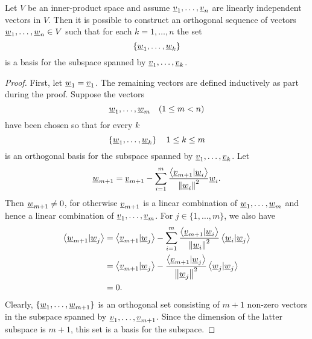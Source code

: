 \begin{theorem}
Let $V$ be an inner-product space and assume $\underline{v}_1, \ldots, \underline{v}_n$ are linearly independent vectors in $V$.
Then it is possible to construct an orthogonal sequence of vectors $\underline{w}_1, \ldots, \underline{w}_n \in V$ such that for each $k = 1, \ldots, n$ the set
\begin{equation*}
\left\{ \underline{w}_1, \ldots, \underline{w}_k \right\}
\end{equation*}
is a basis for the subspace spanned by $\underline{v}_1, \ldots, \underline{v}_k$.
\end{theorem}
\begin{proof}
First, let $\underline{w}_1 = \underline{v}_1$.
The remaining vectors are defined inductively as part during the proof.
Suppose the vectors
\begin{equation*}
\underline{w}_1, \ldots, \underline{w}_m \quad (1 \leq m < n)
\end{equation*}
have been chosen so that for every $k$
\begin{equation*}
\left\{ \underline{w}_1, \ldots, \underline{w}_k \right\} \quad 1 \leq k \leq m
\end{equation*}
is an orthogonal basis for the subspace spanned by $\underline{v}_1, \ldots, \underline{v}_k$.
Let
\begin{equation*}
\underline{w}_{m+1} = \underline{v}_{m+1} - \sum_{i=1}^m \frac{ \left\langle \underline{v}_{m+1} | \underline{w}_i \right\rangle } { \left\| \underline{w}_i \right\|^2 } \underline{w}_i.
\end{equation*}
Then $\underline{w}_{m+1} \neq 0$, for otherwise $\underline{v}_{m+1}$ is a linear combination of $\underline{w}_1, \ldots, \underline{w}_m$ and hence a linear combination of $\underline{v}_1, \ldots, \underline{v}_m$.
For $j \in \{1, \ldots, m\}$, we also have
\begin{equation*}
\begin{split}
\left\langle \underline{w}_{m+1} | \underline{w}_j \right\rangle
&= \left\langle \underline{v}_{m+1} | \underline{w}_j \right\rangle
- \sum_{i=1}^m \frac{ \left\langle \underline{v}_{m+1} | \underline{w}_i \right\rangle } { \left\| \underline{w}_i \right\|^2 }
\left\langle \underline{w}_i | \underline{w}_j \right\rangle \\
&= \left\langle \underline{v}_{m+1} | \underline{w}_j \right\rangle
- \frac{ \left\langle \underline{v}_{m+1} | \underline{w}_j \right\rangle } { \left\| \underline{w}_j \right\|^2 }
\left\langle \underline{w}_j | \underline{w}_j \right\rangle \\
&= 0.
\end{split}
\end{equation*}
Clearly, $\{ \underline{w}_1, \ldots, \underline{w}_{m+1} \}$ is an orthogonal set consisting of $m+1$ non-zero vectors in the subspace spanned by $\underline{v}_1, \ldots, \underline{v}_{m+1}$.
Since the dimension of the latter subspace is $m+1$, this set is a basis for the subspace.
\end{proof}

